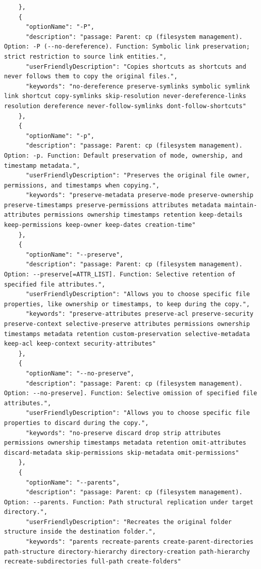 \begin{appendix}
\begin{lstlisting}
    },
    {
      "optionName": "-P",
      "description": "passage: Parent: cp (filesystem management). Option: -P (--no-dereference). Function: Symbolic link preservation; strict restriction to source link entities.",
      "userFriendlyDescription": "Copies shortcuts as shortcuts and never follows them to copy the original files.",
      "keywords": "no-dereference preserve-symlinks symbolic symlink link shortcut copy-symlinks skip-resolution never-dereference-links resolution dereference never-follow-symlinks dont-follow-shortcuts"
    },
    {
      "optionName": "-p",
      "description": "passage: Parent: cp (filesystem management). Option: -p. Function: Default preservation of mode, ownership, and timestamp metadata.",
      "userFriendlyDescription": "Preserves the original file owner, permissions, and timestamps when copying.",
      "keywords": "preserve-metadata preserve-mode preserve-ownership preserve-timestamps preserve-permissions attributes metadata maintain-attributes permissions ownership timestamps retention keep-details keep-permissions keep-owner keep-dates creation-time"
    },
    {
      "optionName": "--preserve",
      "description": "passage: Parent: cp (filesystem management). Option: --preserve[=ATTR_LIST]. Function: Selective retention of specified file attributes.",
      "userFriendlyDescription": "Allows you to choose specific file properties, like ownership or timestamps, to keep during the copy.",
      "keywords": "preserve-attributes preserve-acl preserve-security preserve-context selective-preserve attributes permissions ownership timestamps metadata retention custom-preservation selective-metadata keep-acl keep-context security-attributes"
    },
    {
      "optionName": "--no-preserve",
      "description": "passage: Parent: cp (filesystem management). Option: --no-preserve]. Function: Selective omission of specified file attributes.",
      "userFriendlyDescription": "Allows you to choose specific file properties to discard during the copy.",
      "keywords": "no-preserve discard drop strip attributes permissions ownership timestamps metadata retention omit-attributes discard-metadata skip-permissions skip-metadata omit-permissions"
    },
    {
      "optionName": "--parents",
      "description": "passage: Parent: cp (filesystem management). Option: --parents. Function: Path structural replication under target directory.",
      "userFriendlyDescription": "Recreates the original folder structure inside the destination folder.",
      "keywords": "parents recreate-parents create-parent-directories path-structure directory-hierarchy directory-creation path-hierarchy recreate-subdirectories full-path create-folders"

\end{lstlisting}
\end{appendix}
